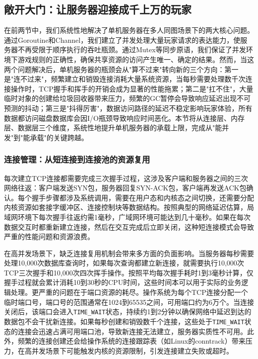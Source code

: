 \subsection{敞开大门：让服务器迎接成千上万的玩家}

在前两节中，我们系统性地解决了单机服务器在多人同图场景下的两大核心问题。通过Goroutine和Channel，我们建立了并发处理大量玩家请求的表达能力，使服务器不再受限于顺序执行的吞吐瓶颈。通过Mutex等同步原语，我们保证了并发环境下游戏规则的正确性，确保共享资源的访问产生唯一、确定的结果。然而，当这两个问题解决后，单机服务器的瓶颈会从"算不过来"转向新的三个方向：第一是"连不过来"，频繁建立和销毁连接消耗大量系统资源，当每秒需要处理数千次连接操作时，TCP握手和挥手的开销会成为显著的性能拖累；第二是"扛不住"，大量临时对象的创建给垃圾回收器带来压力，频繁的GC暂停会导致响应延迟出现不可预测的抖动；第三是"抖得厉害"，数据访问路径的延迟不稳定影响玩家体验，所有数据都访问磁盘数据库会因I/O瓶颈导致响应时间恶化。本节将从连接层、内存层、数据层三个维度，系统性地提升单机服务器的承载上限，完成从"能并发"到"能承载"的关键跨越。

\subsubsection{连接管理：从短连接到连接池的资源复用}

每次建立TCP连接都需要完成三次握手过程，这涉及客户端和服务器之间的三次网络往返：客户端发送SYN包，服务器回复SYN-ACK包，客户端再发送ACK包确认。每个握手步骤都涉及系统调用，需要在用户态和内核态之间切换，还需要分配内核资源如套接字缓冲区、连接控制块等数据结构。按照典型的网络延迟估算，局域网环境下每次握手往返约需1毫秒，广域网环境可能达到几十毫秒。如果在每次数据交互时都重新建立连接，然后在交互完成后立即关闭，这种短连接模式会导致严重的性能问题和资源浪费。

在高并发场景下，缺乏连接复用机制会带来多方面的负面影响。当服务器每秒需要处理10,000次数据库查询时，如果每次查询都建立新连接，就需要执行10,000次TCP三次握手和10,000次四次挥手操作。按照平均每次握手耗时1到3毫秒计算，仅握手过程就会累计消耗10到30秒的CPU时间，这些时间本可以用于实际的业务逻辑处理。更严重的问题在于端口资源的耗尽。操作系统为每个TCP连接分配一个临时端口号，端口号的范围通常在1024到65535之间，可用端口约为6万个。当连接关闭后，该端口会进入\texttt{TIME\_WAIT}状态，持续约1到2分钟以确保网络中延迟到达的数据包不会干扰新连接。如果每秒创建和销毁数千个连接，这些处于\texttt{TIME\_WAIT}状态的连接会迅速占满可用端口池，导致新连接无法建立，服务器实质性不可用。此外，频繁的连接创建还会给操作系统的连接跟踪表（如Linux的conntrack）带来压力，在高并发场景下可能触发内核的资源限制，引发连接建立失败或超时。

